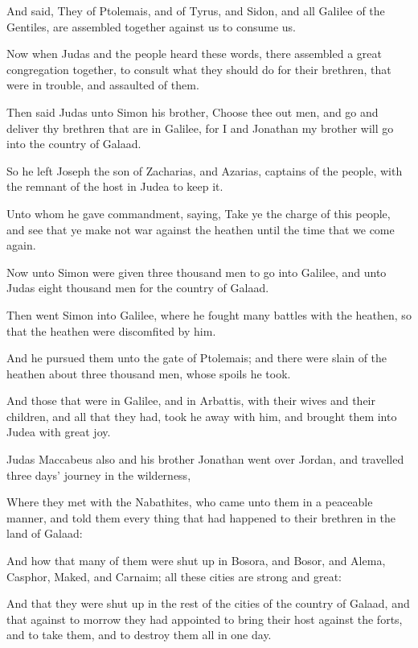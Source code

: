 {\par }{\PP {}And said, They of Ptolemais, and of Tyrus, and Sidon, and all Galilee of the Gentiles, are assembled together against us to consume us.
\par }{\PP {}Now when Judas and the people heard these words, there assembled a great congregation together, to consult what they should do for their brethren, that were in trouble, and assaulted of them.
\par }{\PP {}Then said Judas unto Simon his brother, Choose thee out men, and go and deliver thy brethren that are in Galilee, for I and Jonathan my brother will go into the country of Galaad.
\par }{\PP {}So he left Joseph the son of Zacharias, and Azarias, captains of the people, with the remnant of the host in Judea to keep it.
\par }{\PP {}Unto whom he gave commandment, saying, Take ye the charge of this people, and see that ye make not war against the heathen until the time that we come again.
\par }{\PP {}Now unto Simon were given three thousand men to go into Galilee, and unto Judas eight thousand men for the country of Galaad.
\par }{\PP {}Then went Simon into Galilee, where he fought many battles with the heathen, so that the heathen were discomfited by him.
\par }{\PP {}And he pursued them unto the gate of Ptolemais; and there were slain of the heathen about three thousand men, whose spoils he took.
\par }{\PP {}And those that were in Galilee, and in Arbattis, with their wives and their children, and all that they had, took he away with him, and brought them into Judea with great joy.
\par }{\PP {}Judas Maccabeus also and his brother Jonathan went over Jordan, and travelled three days’ journey in the wilderness,
\par }{\PP {}Where they met with the Nabathites, who came unto them in a peaceable manner, and told them every thing that had happened to their brethren in the land of Galaad:
\par }{\PP {}And how that many of them were shut up in Bosora, and Bosor, and Alema, Casphor, Maked, and Carnaim; all these cities are strong and great:
\par }{\PP {}And that they were shut up in the rest of the cities of the country of Galaad, and that against to morrow they had appointed to bring their host against the forts, and to take them, and to destroy them all in one day.
}
